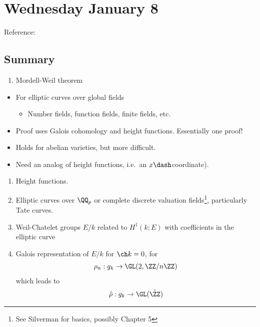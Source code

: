 \newpage
\tableofcontents

\hypertarget{wednesday-january-8}{%
\section{Wednesday January 8}\label{wednesday-january-8}}

Reference: \autocite{silverman_2009}

\hypertarget{summary}{%
\subsection{Summary}\label{summary}}

\begin{enumerate}
\def\labelenumi{\arabic{enumi}.}
\tightlist
\item
  Mordell-Weil theorem
\end{enumerate}

\begin{itemize}
\item
  For elliptic curves over global fields

  \begin{itemize}
  \tightlist
  \item
    Number fields, function fields, finite fields, etc.
  \end{itemize}
\item
  Proof uses Galois cohomology and height functions. Essentially one
  proof!
\item
  Holds for abelian varieties, but more difficult.
\item
  Need an analog of height functions, i.e.~an \(x\dash\)coordinate).
\end{itemize}

\begin{enumerate}
\def\labelenumi{\arabic{enumi}.}
\setcounter{enumi}{1}
\item
  Height functions.
\item
  Elliptic curves over \(\QQ_p\) or complete discrete valuation
  fields\footnote{See Silverman for basics, possibly Chapter 5},
  particularly Tate curves.
\item
  Weil-Chatelet groups \(E/k\) related to \(H^1(k; E)\) with
  coefficients in the elliptic curve
\item
  Galois representation of \(E/k\) for \(\ch k = 0\), for
  \begin{align*}
    \rho_n: g_k \to \GL(2, \ZZ/n\ZZ)
    \end{align*} which leads to
  \begin{align*}
    \hat \rho: g_k \to \GL(\hat \ZZ)
    \end{align*}
\end{enumerate}


